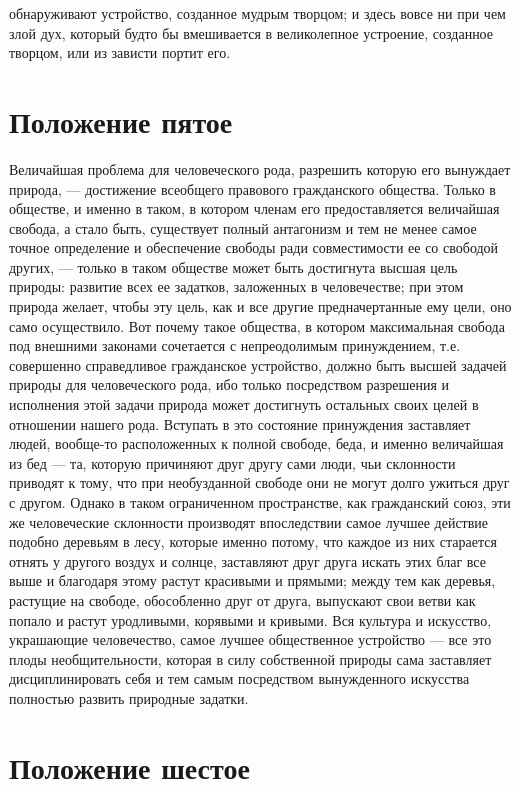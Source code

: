 \documentclass[a4paper]{book}
\begin{document}
обнаруживают устройство, созданное мудрым творцом; и здесь вовсе ни при чем злой дух, который будто бы вмешивается в великолепное устроение, созданное творцом, или из зависти портит его.

\section{Положение пятое}

Величайшая проблема для человеческого рода, разрешить которую его вынуждает природа, — достижение всеобщего правового гражданского общества. Только в обществе, и именно в таком, в котором членам его предоставляется величайшая свобода, а стало быть, существует полный антагонизм и тем не менее самое точное определение и обеспечение свободы ради совместимости ее со свободой других, — только в таком обществе может быть достигнута высшая цель природы: развитие всех ее задатков, заложенных в человечестве; при этом природа желает, чтобы эту цель, как и все другие предначертанные ему цели, оно само осуществило. Вот почему такое общества, в котором максимальная свобода под внешними законами сочетается с непреодолимым принуждением, т.е. совершенно справедливое гражданское устройство, должно быть высшей задачей природы для человеческого рода, ибо только посредством разрешения и исполнения этой задачи природа может достигнуть остальных своих целей в отношении нашего рода. Вступать в это состояние принуждения заставляет людей, вообще-то расположенных к полной свободе, беда, и именно величайшая из бед — та, которую причиняют друг другу сами люди, чьи склонности приводят к тому, что при необузданной свободе они не могут долго ужиться друг с другом. Однако в таком ограниченном пространстве, как гражданский союз, эти же человеческие склонности производят впоследствии самое лучшее действие подобно деревьям в лесу, которые именно потому, что каждое из них старается отнять у другого воздух и солнце, заставляют друг друга искать этих благ все выше и благодаря этому растут красивыми и прямыми; между тем как деревья, растущие на свободе, обособленно друг от друга, выпускают свои ветви как попало и растут уродливыми, корявыми и кривыми. Вся культура и искусство, украшающие человечество, самое лучшее общественное устройство — все это плоды необщительности, которая в силу собственной природы сама заставляет дисциплинировать себя и тем самым посредством вынужденного искусства полностью развить природные задатки.

\section{Положение шестое}
\end{document}
